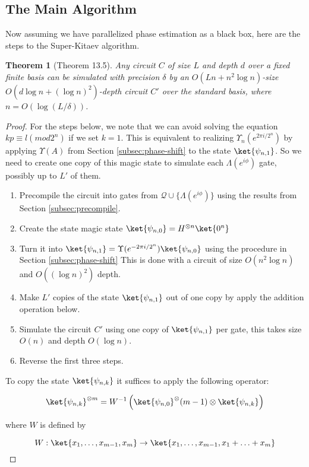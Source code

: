 \documentclass{article}
\theoremstyle{plain}
\newtheorem{theorem}{Theorem}
\begin{document}
\subsection{The Main Algorithm}
\label{subsec:main}

Now assuming we have parallelized phase estimation as a black box, here are
the steps to the Super-Kitaev algorithm.

\begin{theorem}[Theorem 13.5]
Any circuit $C$ of size $L$ and depth $d$ over a fixed finite basis can be
simulated with precision $\delta$ by an $O(Ln + n^2\log n)$-size
$O(d \log n + (\log n)^2)$-depth circuit $C'$ over the standard basis, where
$n = O(\log(L/\delta))$.
\end{theorem}

\begin{proof}

For the steps below, we note that we can avoid solving the equation $kp \equiv l (mod 2^n)$
if we set $k=1$. This is equivalent to realizing $\Upsilon_n(e^{2\pi i / 2^n})$
by applying $\Upsilon(A)$ from Section \ref{subsec:phase-shift} to the state
$\ket{\psi_{n,1}}$. So we need to create one copy of this magic state to
simulate each $\Lambda(e^{i\phi})$ gate, possibly up to $L'$ of them.

\begin{enumerate}
\item Precompile the circuit into gates from $\mathcal{Q} \cup \{\Lambda(e^{i\phi})\}$
using the results from Section \ref{subsec:precompile}.
\item Create the state magic state $\ket{\psi_{n,0}} = H^{\otimes n}\ket{0^n}$
\item Turn it into $\ket{\psi_{n,1}} = \Upsilon(e^{-2\pi i / 2^n}) \ket{\psi_{n,0}}$
using the procedure in Section \ref{subsec:phase-shift}
This is done with a circuit of size $O(n^2\log n)$ and $O((\log n)^2)$ depth.
\item Make $L'$ copies of the state $\ket{\psi_{n,1}}$ out of one copy by 
apply the addition operation below.
\item Simulate the circuit $C'$ using one copy of $\ket{\psi_{n,1}}$ per gate,
this takes size $O(n)$ and depth $O(\log n)$.
\item Reverse the first three steps.
\end{enumerate}

To copy the state $\ket{\psi_{n,k}}$ it suffices to apply the following
operator:

\begin{equation}
\ket{\psi_{n,k}}^{\otimes m} = W^{-1}\left( \ket{\psi_{n,0}}^\otimes(m-1) \otimes \ket{\psi_{n,k}} \right)
\end{equation}

where $W$ is defined by

\begin{equation}
W : \ket{x_1,\ldots,x_{m-1},x_m} \rightarrow \ket{x_1,\ldots,x_{m-1},x_1+\ldots+x_m}
\end{equation}

\end{proof}



\end{document}
